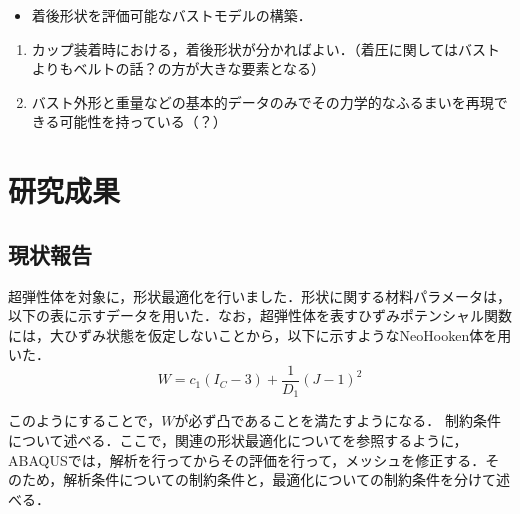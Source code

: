 \documentclass[11pt]{jsarticle}
\begin{document}
	\articleSPRabst
		\begin{itemize}
			\item 着後形状を評価可能なバストモデルの構築．
		\end{itemize}
		
		
	\articleSPRobj
		\begin{enumerate}
			\item カップ装着時における，着後形状が分かればよい．（着圧に関してはバストよりもベルトの話？の方が大きな要素となる）
			\item バスト外形と重量などの基本的データのみでその力学的なふるまいを再現できる可能性を持っている（？）
		\end{enumerate}
	\articleSPRitemsone
		
		\tableofcontents
		
		
	\articleSPRitemstwo
	\section{研究成果}
			\subsection{現状報告}
			超弾性体を対象に，形状最適化を行いました．形状に関する材料パラメータは，以下の表に示すデータを用いた．なお，超弾性体を表すひずみポテンシャル関数には，大ひずみ状態を仮定しないことから，以下に示すようなNeoHooken体を用いた．
			\begin{equation}
				W = c_1(I_C-3) + \frac{1}{D_1}(J-1)^2
			\end{equation}
			
			このようにすることで，$ W $が必ず凸であることを満たすようになる．
			制約条件について述べる．ここで，関連の形状最適化についてを参照するように，ABAQUSでは，解析を行ってからその評価を行って，メッシュを修正する．そのため，解析条件についての制約条件と，最適化についての制約条件を分けて述べる．
			
\end{document}

